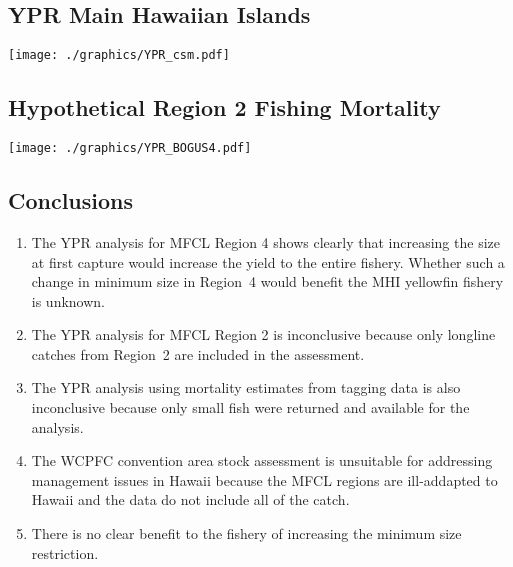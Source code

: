 \documentclass[a4paper,KOMA,landscape,titlepage]{powersem}
\begin{document}
\begin{slide}\section{YPR Main Hawaiian Islands}
\begin{center}
\texttt{[image: ./graphics/YPR\_csm.pdf]}
\end{center}
\end{slide}

\begin{slide}\section{Hypothetical Region 2 Fishing Mortality}
\begin{center}
\texttt{[image: ./graphics/YPR\_BOGUS4.pdf]}
\end{center}
\end{slide}

\begin{slide}\section{Conclusions}
\begin{enumerate}
\item The YPR analysis for MFCL Region 4 shows clearly that increasing
the size at first capture would increase the yield to the entire fishery.
Whether such a change in minimum size in Region~4 would
benefit the MHI yellowfin fishery is unknown.

\item The YPR analysis for MFCL Region 2 is inconclusive because only
longline catches from Region~2 are included in the assessment.

\item The YPR analysis using mortality estimates from tagging data is
also inconclusive because only small fish were returned and
available for the analysis. 

\item The WCPFC convention area stock assessment is unsuitable for
addressing management issues in Hawaii because the
MFCL regions are ill-addapted to Hawaii and the data do not include
all of the catch.

\item There is no clear benefit to the fishery of increasing the
minimum size restriction.
\end{enumerate}
\end{slide}
\end{document}
